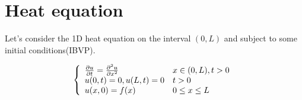 \documentclass[12pt]{article} %
\begin{document}
\section{Heat equation}
\hspace{5mm}Let's consider the 1D heat equation on the interval $(0, L)$ and subject to some initial conditions(IBVP).\par
\begin{equation}
\left \{ \begin{array}{llc}
\pdv{u}{t} =\frac{\partial^{2}u}{\partial x^{2}} & x \in (0,L),  t>0 \\
u(0,t) = 0, u(L, t) = 0& t>0 \\
u(x, 0) = f(x) & 0 \leq x \leq L
\end{array}\right.
\end{equation}
\end{document}
